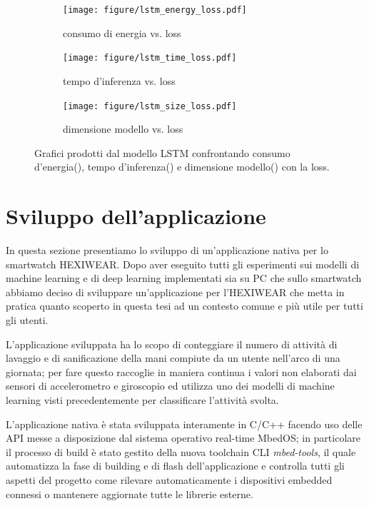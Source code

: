\begin{figure}[!htb]
    \centering
    \begin{subfigure}{.45\textwidth}
        \texttt{[image: figure/lstm\_energy\_loss.pdf]}
        \caption{consumo di energia vs. loss}
        \label{fig:performance-lstm-hexi:lstm-energy-loss}
    \end{subfigure}
    \begin{subfigure}{.45\textwidth}
        \texttt{[image: figure/lstm\_time\_loss.pdf]}
        \caption{tempo d'inferenza vs. loss}
        \label{fig:performance-lstm-hexi:lstm-time-loss}
    \end{subfigure}
    \begin{subfigure}{.45\textwidth}
        \texttt{[image: figure/lstm\_size\_loss.pdf]}
        \caption{dimensione modello vs. loss}
        \label{fig:performance-lstm-hexi:lstm-size-loss}
    \end{subfigure}
    \caption{Grafici prodotti dal modello LSTM confrontando consumo d'energia(), tempo d'inferenza() e dimensione modello() con la loss.}
    \label{fig:performance-lstm-hexi}
\end{figure}

\section{Sviluppo dell'applicazione}
\label{sec:sviluppo-dell-applicazione}

In questa sezione presentiamo lo sviluppo di un'applicazione nativa per lo smartwatch HEXIWEAR. Dopo aver eseguito tutti gli esperimenti sui modelli di machine learning e di deep learning implementati sia su PC che sullo smartwatch abbiamo deciso di sviluppare un'applicazione per l'HEXIWEAR che metta in pratica quanto scoperto in questa tesi ad un contesto comune e più utile per tutti gli utenti. 

L'applicazione sviluppata ha lo scopo di conteggiare il numero di attività di lavaggio e di sanificazione della mani compiute da un utente nell'arco di una giornata; per fare questo raccoglie in maniera continua i valori non elaborati dai sensori di accelerometro e giroscopio ed utilizza uno dei modelli di machine learning visti precedentemente per classificare l'attività svolta. 

L'applicazione nativa è stata sviluppata interamente in C/C++ facendo uso delle API messe a disposizione dal sistema operativo real-time MbedOS; in particolare il processo di build è stato gestito della nuova toolchain CLI \textit{mbed-tools}\cite{mbedtools}, il quale automatizza la fase di building e di flash dell'applicazione e controlla tutti gli aspetti del progetto come rilevare automaticamente i dispositivi embedded connessi o mantenere aggiornate tutte le librerie esterne.

